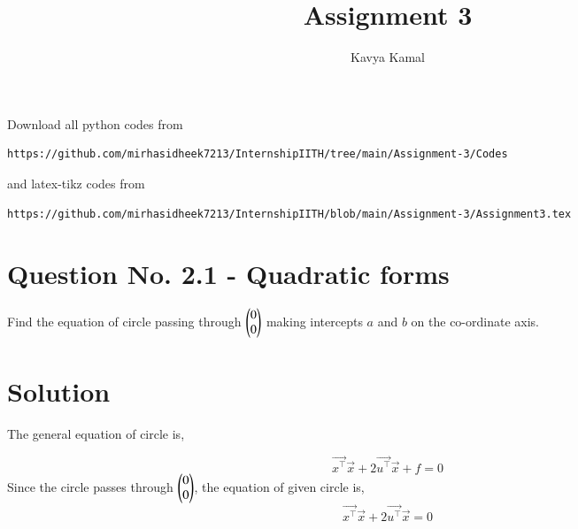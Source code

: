\documentclass[journal,12pt,twocolumn]{IEEEtran}
\begin{document}
     \def\centbox#1{\makebox[0in]{#1}}
     \def\topbox#1{\raisebox{-\baselineskip}[0in][0in]{#1}}
     \def\midbox#1{\raisebox{-0.5\baselineskip}[0in][0in]{#1}}
\vspace{3cm}
\title{Assignment 3}
\author{Kavya Kamal}
\maketitle
\newpage
\bigskip
\renewcommand{\thefigure}{\theenumi}
\renewcommand{\thetable}{\theenumi}
Download all python codes from 
\begin{lstlisting}
https://github.com/mirhasidheek7213/InternshipIITH/tree/main/Assignment-3/Codes
\end{lstlisting}

%
and latex-tikz codes from 
%
\begin{lstlisting}
https://github.com/mirhasidheek7213/InternshipIITH/blob/main/Assignment-3/Assignment3.tex
\end{lstlisting}

\section{\textbf{Question No. 2.1 - Quadratic forms}}

\noindent Find the equation of circle passing through $\begin{pmatrix}0\\0\end{pmatrix}$ making intercepts $a$ and $b$ on the co-ordinate axis.
%

\section{\textbf {Solution}}


The general equation of circle is,

\begin{equation}
\vec{x^\top}\vec{x}+2\vec{u^\top}\vec{x}+f=0 \label{eq:1}
\end{equation}
Since the circle passes through $\begin{pmatrix}0\\0\end{pmatrix}$, the equation of given circle is,
\begin{equation}
    \vec{x^\top}\vec{x}+2\vec{u^\top}\vec{x}=0 \label{eq:2}
\end{equation}
\end{document}
